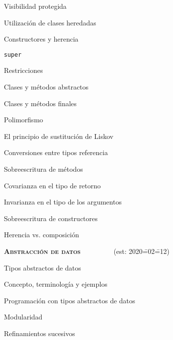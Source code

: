 \begin{longenum}
\begin{longenum}
\begin{longenum}
            \item Visibilidad protegida
            \item Utilización de clases heredadas
            \item Constructores y herencia
            \item \texttt{super}
            \item Restricciones
            \begin{longenum}
                \item Clases y métodos abstractos
                \item Clases y métodos finales
            \end{longenum}
        \end{longenum}
        \item Polimorfismo
        \begin{longenum}
            \item El principio de sustitución de Liskov
            \item Conversiones entre tipos referencia
            \item Sobreescritura de métodos
            \begin{longenum}
                \item Covarianza en el tipo de retorno
                \item Invarianza en el tipo de los argumentos
            \end{longenum}
            \item Sobreescritura de constructores
        \end{longenum}
        \item Herencia vs. composición
    \end{longenum}
    \item \textbf{\textsc{Abstracción de datos}} \ \ \ \ \ \ \ \ \ (est: 2020\==02\==12)
    \begin{longenum}
        \item Tipos abstractos de datos
        \begin{longenum}
            \item Concepto, terminología y ejemplos
            \item Programación con tipos abstractos de datos
            \begin{longenum}
                \item Modularidad
                \item Refinamientos sucesivos

\end{longenum}
\end{longenum}
\end{longenum}
\end{longenum}
